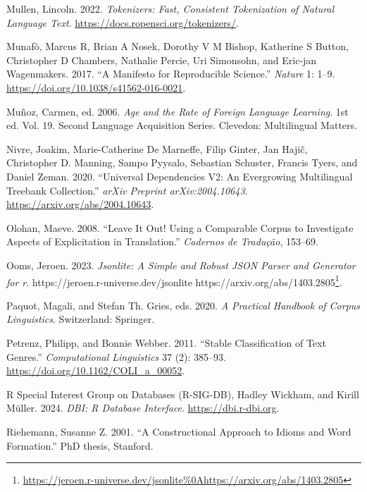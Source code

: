 \documentclass[
  letterpaper,
  DIV=11,
  numbers=noendperiod]{scrreprt}
\newlength{\cslhangindent}
\newenvironment{CSLReferences}[2] %
 {\begin{list}{}{%
  \setlength{\itemindent}{0pt}
  \setlength{\leftmargin}{0pt}
  \setlength{\parsep}{0pt}
  \ifodd #1
   \setlength{\leftmargin}{\cslhangindent}
   \setlength{\itemindent}{-1\cslhangindent}
  \fi
  \setlength{\itemsep}{#2\baselineskip}}}
 {\end{list}}
\theoremstyle{definition}
\theoremstyle{remark}
\DeclareRobustCommand{\href}[2]{#2\footnote{\url{#1}}}
\begin{document}
\begin{CSLReferences}{1}{0}
Mullen, Lincoln. 2022. \emph{Tokenizers: Fast, Consistent Tokenization
of Natural Language Text}. \url{https://docs.ropensci.org/tokenizers/}.

Munafò, Marcus R, Brian A Nosek, Dorothy V M Bishop, Katherine S Button,
Christopher D Chambers, Nathalie Percie, Uri Simonsohn, and Eric-jan
Wagenmakers. 2017. {``A Manifesto for Reproducible Science.''}
\emph{Nature} 1: 1--9. \url{https://doi.org/10.1038/s41562-016-0021}.

Muñoz, Carmen, ed. 2006. \emph{Age and the Rate of Foreign Language
Learning}. 1st ed. Vol. 19. Second Language Acquisition Series.
Clevedon: Multilingual Matters.

Nivre, Joakim, Marie-Catherine De Marneffe, Filip Ginter, Jan Hajič,
Christopher D. Manning, Sampo Pyysalo, Sebastian Schuster, Francis
Tyers, and Daniel Zeman. 2020. {``Universal Dependencies V2: An
Evergrowing Multilingual Treebank Collection.''} \emph{arXiv Preprint
arXiv:2004.10643}. \url{https://arxiv.org/abs/2004.10643}.

Olohan, Maeve. 2008. {``Leave It Out! Using a Comparable Corpus to
Investigate Aspects of Explicitation in Translation.''} \emph{Cadernos
de Tradu{ç}{ã}o}, 153--69.

Ooms, Jeroen. 2023. \emph{Jsonlite: A Simple and Robust JSON Parser and
Generator for r}.
\href{https://jeroen.r-universe.dev/jsonlite\%0Ahttps://arxiv.org/abs/1403.2805}{https://jeroen.r-universe.dev/jsonlite
https://arxiv.org/abs/1403.2805}.

Paquot, Magali, and Stefan Th. Gries, eds. 2020. \emph{A Practical
Handbook of Corpus Linguistics}. Switzerland: Springer.

Petrenz, Philipp, and Bonnie Webber. 2011. {``Stable Classification of
Text Genres.''} \emph{Computational Linguistics} 37 (2): 385--93.
\url{https://doi.org/10.1162/COLI_a_00052}.

R Special Interest Group on Databases (R-SIG-DB), Hadley Wickham, and
Kirill Müller. 2024. \emph{DBI: R Database Interface}.
\url{https://dbi.r-dbi.org}.

Riehemann, Susanne Z. 2001. {``A Constructional Approach to Idioms and
Word Formation.''} PhD thesis, Stanford.


\end{CSLReferences}
\end{document}
